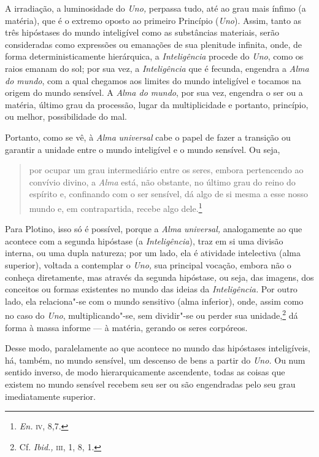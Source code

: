 A irradiação, a luminosidade do \emph{Uno,} perpassa tudo, até
ao grau mais ínfimo (a matéria), que é o extremo oposto ao
primeiro Princípio (\emph{Uno}). Assim, tanto as três
hipóstases do mundo inteligível como as substâncias materiais,
serão consideradas como expressões ou emanações  de sua 
plenitude infinita, onde, de forma deterministicamente
hierárquica, a \emph{Inteligência} procede do \emph{Uno},
como os raios emanam do sol; por sua vez, a
\emph{Inteligência} que é fecunda, engendra a \emph{Alma do
mundo}, com a qual chegamos aos limites do mundo inteligível e
tocamos na origem do mundo sensível. A \emph{Alma do mundo},
por sua vez, engendra o ser ou a matéria, último grau da
processão, lugar da multiplicidade e portanto, princípio, ou
melhor, possibilidade do mal.

Portanto, como se vê, à \emph{Alma} \emph{universal} cabe o
papel de fazer a transição ou garantir a unidade entre o mundo
inteligível e o mundo sensível. Ou seja, 

\begin{quote}
por ocupar um grau intermediário entre os seres, embora
pertencendo ao convívio divino, a \emph{Alma} está, não
obstante, no último grau do reino do espírito e, confinando com
o ser sensível, dá algo de si mesma a esse nosso mundo e, em
contrapartida, recebe algo dele.\footnote{ \emph{En.} \textsc{iv},
8,7.}
\end{quote}

Para Plotino, isso só é possível, porque a \emph{Alma}
\emph{universal}\emph{,} analogamente ao que acontece com a
segunda hipóstase (a \emph{Inteligência}), traz em si uma
divisão interna, ou uma dupla natureza;  por um lado, ela é
atividade intelectiva (alma superior), voltada a contemplar o
\emph{Uno,} sua principal vocação, embora não o conheça
diretamente, mas através da segunda hipóstase\emph{,} ou seja,
das imagens, dos conceitos ou formas existentes no mundo das
ideias da \emph{Inteligência.} Por outro lado, ela 
relaciona"-se com o mundo sensitivo (alma inferior), onde, assim
como no caso do \emph{Uno}, multiplicando"-se, sem dividir"-se
ou perder sua unidade,\footnote{ Cf. \emph{Ibid.,} \textsc{iii}, 1, 8,
1.} dá forma à massa informe --- à matéria, gerando os
seres corpóreos.

Desse modo, paralelamente ao que acontece no mundo das hipóstases
inteligíveis, há, também, no mundo sensível, um descenso de bens
a partir do \emph{Uno.}  Ou num sentido inverso, de modo
hierarquicamente ascendente, todas as coisas que existem no
mundo sensível recebem seu ser ou são engendradas pelo seu grau
imediatamente superior. 

